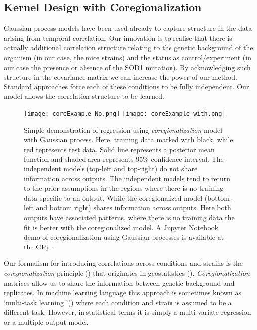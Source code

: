 \subsection{Kernel Design with Coregionalization}\label{subSec:Kernel_Design_with_Coregionalization}
Gaussian process models have been used already to capture structure in the data arising from temporal correlation. Our innovation is to realise that there is actually additional correlation structure relating to the genetic background of the organism (in our case, the mice strains) and the status as control/experiment (in our case the presence or absence of the SOD1 mutation). By acknowledging such structure in the covariance matrix we can increase the power of our method. Standard approaches force each of these conditions to be fully independent. Our model allows the correlation structure to be learned.
\begin{figure}
 \begin{center}
  \texttt{[image: coreExample\_No.png]}
  \texttt{[image: coreExample\_with.png]}
    \caption [Simple demonstration of  \emph{coregionalization} model] 
    {Simple demonstration of regression using \emph{coregionalization} model with Gaussian process. Here, training data marked with black, while red represents test data. Solid line represents a posterior mean function and shaded area represents 95\% confidence interval. The independent models (top-left and top-right) do not share information across outputs. The independent models tend to return to the prior assumptions in the regions where there is no training data specific to an output. While the coregionalized model (bottom-left and bottom right) shares information across outputs. Here both outputs have associated patterns, where there is no training data the fit is better with the coregionalized model. A Jupyter Notebook demo of coregionalization using Gaussian processes is available at the GPy \cite{gpy2014}.
  \label{fig:demoCoregionalization}}
 \end{center}
\end{figure}

Our formalism for introducing correlations across conditions and strains is the \emph{coregionalization} principle (\cite{Alvarez:2011}) that originates in geostatistics (\cite{Wackernagel:2003}). \emph{Coregionalization} matrices allow us to share the information between genetic background and replicates. In machine learning language this approach is sometimes known as \lq multi-task learning \rq (\cite{Bonilla:2007}) where each condition and strain is assumed to be a different task. However, in statistical terms it is simply a multi-variate regression or a multiple output model.

